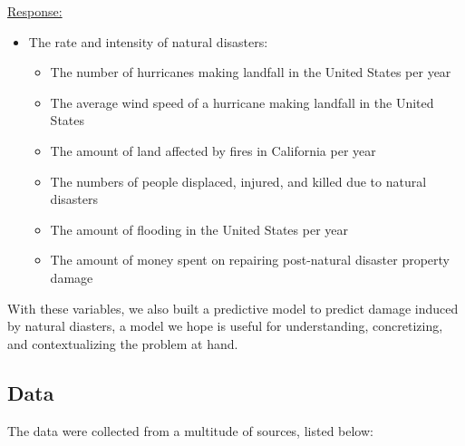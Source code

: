 \documentclass[10pt,]{article}
\begin{document}
\underline{Response:}

\begin{itemize}
  \item The rate and intensity of natural disasters:
  \begin{itemize}
    \item The number of hurricanes making landfall in the United States per year
    \item The average wind speed of a hurricane making landfall in the United States
    \item The amount of land affected by fires in California per year
    \item The numbers of people displaced, injured, and killed due to natural disasters
    \item The amount of flooding in the United States per year
    \item The amount of money spent on repairing post-natural disaster property damage
  \end{itemize}
\end{itemize}

With these variables, we also built a predictive model to predict damage
induced by natural diasters, a model we hope is useful for
understanding, concretizing, and contextualizing the problem at hand.

\subsection{Data}\label{data}

The data were collected from a multitude of sources, listed below:
\end{document}
